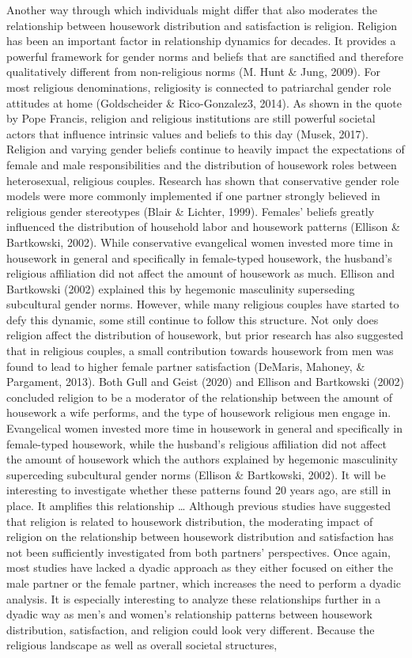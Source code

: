 \documentclass[
  man,floatsintext]{apa6}
\begin{document}
Another way through which individuals might differ that also moderates the relationship between housework distribution and satisfaction is religion. Religion has been an important factor in relationship dynamics for decades. It provides a powerful framework for gender norms and beliefs that are sanctified and therefore qualitatively different from non-religious norms (M. Hunt \& Jung, 2009). For most religious denominations, religiosity is connected to patriarchal gender role attitudes at home (Goldscheider \& Rico-Gonzalez3, 2014). As shown in the quote by Pope Francis, religion and religious institutions are still powerful societal actors that influence intrinsic values and beliefs to this day (Musek, 2017). Religion and varying gender beliefs continue to heavily impact the expectations of female and male responsibilities and the distribution of housework roles between heterosexual, religious couples. Research has shown that conservative gender role models were more commonly implemented if one partner strongly believed in religious gender stereotypes (Blair \& Lichter, 1999). Females' beliefs greatly influenced the distribution of household labor and housework patterns (Ellison \& Bartkowski, 2002). While conservative evangelical women invested more time in housework in general and specifically in female-typed housework, the husband's religious affiliation did not affect the amount of housework as much. Ellison and Bartkowski (2002) explained this by hegemonic masculinity superseding subcultural gender norms. However, while many religious couples have started to defy this dynamic, some still continue to follow this structure. Not only does religion affect the distribution of housework, but prior research has also suggested that in religious couples, a small contribution towards housework from men was found to lead to higher female partner satisfaction (DeMaris, Mahoney, \& Pargament, 2013). Both Gull and Geist (2020) and Ellison and Bartkowski (2002) concluded religion to be a moderator of the relationship between the amount of housework a wife performs, and the type of housework religious men engage in. Evangelical women invested more time in housework in general and specifically in female-typed housework, while the husband's religious affiliation did not affect the amount of housework which the authors explained by hegemonic masculinity superceding subcultural gender norms (Ellison \& Bartkowski, 2002). It will be interesting to investigate whether these patterns found 20 years ago, are still in place. It amplifies this relationship \ldots{} Although previous studies have suggested that religion is related to housework distribution, the moderating impact of religion on the relationship between housework distribution and satisfaction has not been sufficiently investigated from both partners' perspectives. Once again, most studies have lacked a dyadic approach as they either focused on either the male partner or the female partner, which increases the need to perform a dyadic analysis. It is especially interesting to analyze these relationships further in a dyadic way as men's and women's relationship patterns between housework distribution, satisfaction, and religion could look very different. Because the religious landscape as well as overall societal structures, 
\end{document}
